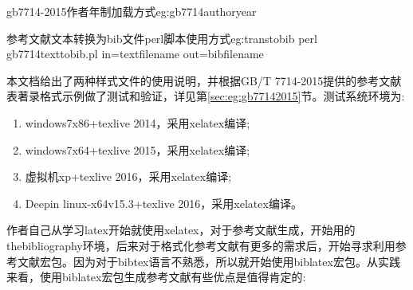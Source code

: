 \begin{codetex}{gb7714-2015作者年制加载方式}{eg:gb7714authoryear}
\usepackage[backend=biber,style=gb7714-2015ay]{biblatex}
\end{codetex}

\begin{codetex}{参考文献文本转换为bib文件perl脚本使用方式}{eg:transtobib}
perl gb7714texttobib.pl in=textfilename out=bibfilename
\end{codetex}

本文档给出了两种样式文件的使用说明，并根据GB/T 7714-2015提供的参考文献表著录格式示例做了测试和验证，详见第\ref{sec:eg:gb77142015}节。测试系统环境为:
\begin{enumerate}
\item windows7x86+texlive 2014，采用xelatex编译;

\item windows7x64+texlive 2015，采用xelatex编译;

\item 虚拟机xp+texlive 2016，采用xelatex编译;

\item Deepin linux-x64v15.3+texlive 2016，采用xelatex编译。
\end{enumerate}

作者自己从学习latex开始就使用xelatex，对于参考文献生成，开始用的thebibliography环境，后来对于格式化参考文献有更多的需求后，开始寻求利用参考文献宏包。因为对于bibtex语言不熟悉，所以就开始使用biblatex宏包。从实践来看，使用biblatex宏包生成参考文献有些优点是值得肯定的:

